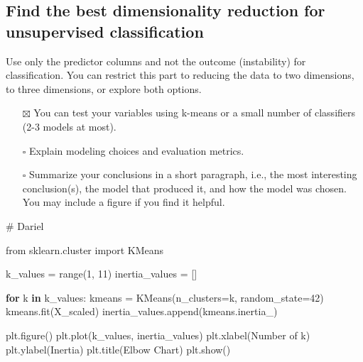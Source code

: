 \documentclass[
  letterpaper,
  DIV=11,
  numbers=noendperiod]{scrartcl}
\newenvironment{Shaded}{\begin{snugshade}}{\end{snugshade}}
\newcommand{\BuiltInTok}[1]{\textcolor[rgb]{0.00,0.23,0.31}{#1}}
\newcommand{\CommentTok}[1]{\textcolor[rgb]{0.37,0.37,0.37}{#1}}
\newcommand{\ControlFlowTok}[1]{\textcolor[rgb]{0.00,0.23,0.31}{\textbf{#1}}}
\newcommand{\DecValTok}[1]{\textcolor[rgb]{0.68,0.00,0.00}{#1}}
\newcommand{\ImportTok}[1]{\textcolor[rgb]{0.00,0.46,0.62}{#1}}
\newcommand{\KeywordTok}[1]{\textcolor[rgb]{0.00,0.23,0.31}{\textbf{#1}}}
\newcommand{\NormalTok}[1]{\textcolor[rgb]{0.00,0.23,0.31}{#1}}
\newcommand{\OperatorTok}[1]{\textcolor[rgb]{0.37,0.37,0.37}{#1}}
\newcommand{\StringTok}[1]{\textcolor[rgb]{0.13,0.47,0.30}{#1}}
\providecommand{\tightlist}{%
  \setlength{\itemsep}{0pt}\setlength{\parskip}{0pt}}\usepackage{longtable,booktabs,array}
\begin{document}
\subsection{Find the best dimensionality reduction for unsupervised
classification}\label{find-the-best-dimensionality-reduction-for-unsupervised-classification}

Use only the predictor columns and not the outcome (instability) for
classification. You can restrict this part to reducing the data to two
dimensions, to three dimensions, or explore both options.

\begin{itemize}
\tightlist
\item[$\boxtimes$]
  You can test your variables using k-means or a small number of
  classifiers (2-3 models at most).
\item[$\square$]
  Explain modeling choices and evaluation metrics.
\item[$\square$]
  Summarize your conclusions in a short paragraph, i.e., the most
  interesting conclusion(s), the model that produced it, and how the
  model was chosen. You may include a figure if you find it helpful.
\end{itemize}

\begin{Shaded}
\begin{Highlighting}[]
\CommentTok{\# Dariel}

\ImportTok{from}\NormalTok{ sklearn.cluster }\ImportTok{import}\NormalTok{ KMeans}

\NormalTok{k\_values }\OperatorTok{=} \BuiltInTok{range}\NormalTok{(}\DecValTok{1}\NormalTok{, }\DecValTok{11}\NormalTok{)}
\NormalTok{inertia\_values }\OperatorTok{=}\NormalTok{ []}

\ControlFlowTok{for}\NormalTok{ k }\KeywordTok{in}\NormalTok{ k\_values:}
\NormalTok{    kmeans }\OperatorTok{=}\NormalTok{ KMeans(n\_clusters}\OperatorTok{=}\NormalTok{k, random\_state}\OperatorTok{=}\DecValTok{42}\NormalTok{)}
\NormalTok{    kmeans.fit(X\_scaled)}
\NormalTok{    inertia\_values.append(kmeans.inertia\_)}

\NormalTok{plt.figure()}
\NormalTok{plt.plot(k\_values, inertia\_values)}
\NormalTok{plt.xlabel(}\StringTok{\textquotesingle{}Number of k\textquotesingle{}}\NormalTok{)}
\NormalTok{plt.ylabel(}\StringTok{\textquotesingle{}Inertia\textquotesingle{}}\NormalTok{)}
\NormalTok{plt.title(}\StringTok{\textquotesingle{}Elbow Chart\textquotesingle{}}\NormalTok{)}
\NormalTok{plt.show()}
\end{Highlighting}
\end{Shaded}
\end{document}

